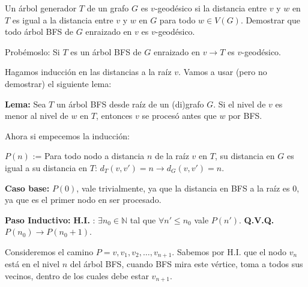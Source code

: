 \documentclass{article}
\begin{document}
Un árbol generador $T$ de un grafo $G$ es $v$-geodésico si la distancia entre $v$ y $w$ en $T$ es igual a la distancia entre $v$ y $w$ en $G$ para todo $w \in V(G)$. Demostrar que todo árbol BFS de $G$ enraizado en $v$ es $v$-geodésico.

Probémoslo: Si $T$ es un árbol BFS de $G$ enraizado en $v \rightarrow T$ es $v$-geodésico.

Hagamos inducción en las distancias a la raíz $v$. Vamos a usar (pero no demostrar) el siguiente lema:

\textbf{Lema:} Sea $T$ un árbol BFS desde raíz de un (di)grafo $G$. Si el nivel de $v$ es menor al nivel de $w$ en $T$, entonces $v$ se procesó antes que $w$ por BFS.

Ahora si empecemos la inducción:

$P(n)$ := Para todo nodo a distancia $n$ de la raíz $v$ en $T$, su distancia en $G$ es igual a su distancia en $T$: $d_T(v,v') = n \rightarrow d_G(v,v') = n$.

\textbf{Caso base:} $P(0)$, vale trivialmente, ya que la distancia en BFS a la raíz es $0$, ya que es el primer nodo en ser procesado.

\textbf{Paso Inductivo:}
\textbf{H.I.} : $\exists n_0 \in \mathbb{N}$ tal que $\forall n' \leq n_0$ vale $P(n')$.
\textbf{Q.V.Q.} $P(n_0) \rightarrow P(n_0 + 1)$.

Consideremos el camino $P = v,v_1,v_2,\ldots,v_{n+1}$. Sabemos por H.I. que el nodo $v_n$ está en el nivel $n$ del árbol BFS, cuando BFS mira este vértice, toma a todos sus vecinos, dentro de los cuales debe estar $v_{n+1}$.
\end{document}
